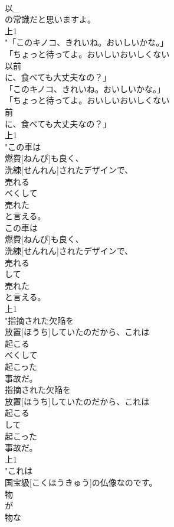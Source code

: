 \documentclass[8pt]{extreport}
\begin{document}
\begin{CJK}{UTF8}{min}
\\	以_
\\	の常識だと思いますよ。
\\	上1
\\	"「このキノコ、きれいね。おいしいかな。」
\\	「ちょっと待ってよ。おいしいおいしくない
\\	以前
\\	に、食べても大丈夫なの？」
\\	「このキノコ、きれいね。おいしいかな。」
\\	「ちょっと待ってよ。おいしいおいしくない
\\	前
\\	に、食べても大丈夫なの？」
\\	上1
\\	"この車は
\\	燃費[ねんぴ]も良く、
\\	洗練[せんれん]されたデザインで、
\\	売れる
\\	べくして
\\	売れた
\\	と言える。
\\	この車は
\\	燃費[ねんぴ]も良く、
\\	洗練[せんれん]されたデザインで、
\\	売れる
\\	して
\\	売れた
\\	と言える。
\\	上1
\\	"指摘された欠陥を
\\	放置[ほうち]していたのだから、これは
\\	起こる
\\	べくして
\\	起こった
\\	事故だ。
\\	指摘された欠陥を
\\	放置[ほうち]していたのだから、これは
\\	起こる
\\	して
\\	起こった
\\	事故だ。
\\	上1
\\	"これは
\\	国宝級[こくほうきゅう]の仏像なのです。
\\	物
\\	が
\\	物な

\end{CJK}
\end{document}
